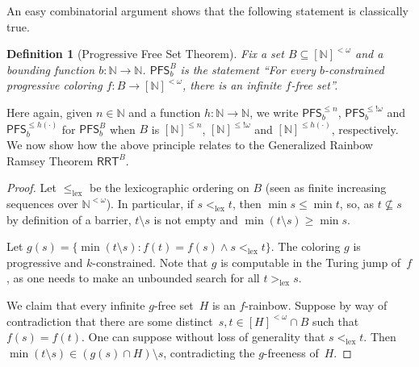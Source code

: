 \documentclass{article}
\newcommand{\RRT}[0]{\mathsf{RRT}}
\newcommand{\PFS}[0]{\mathsf{PFS}}
\newcommand{\NN}[0]{\mathbb{N}}
\newcommand{\lex}{\mathrm{lex}}
\def\qt#1{``#1''}%
\numberwithin{theorem}{section}
\newtheorem{proposition}[theorem]{Proposition}
\newtheorem{definition}[theorem]{Definition}
\begin{document}
An easy combinatorial argument shows that the following statement is classically true.


\begin{definition}[Progressive Free Set Theorem]
Fix a set $B \subseteq [\NN]^{<\omega}$ and a bounding function $b : \NN \to \NN$.
$\PFS^B_b$ is the statement \qt{For every $b$-constrained progressive coloring $f : B \to [\NN]^{<\omega}$, there is an infinite $f$-free set}.
\end{definition}

Here again, given $n \in \NN$ and a function $h : \NN \to \NN$, we write $\PFS^{\leq n}_b$, $\PFS^{\leq !\omega}_b$ and $\PFS^{\leq h(\cdot)}_b$ for $\PFS^B_b$ when $B$ is $[\NN]^{\leq n}$, $[\NN]^{\leq !\omega}$ and $[\NN]^{\leq h(\cdot)}$, respectively.
We now show how the above principle relates to the Generalized Rainbow Ramsey Theorem $\RRT^B$.

\begin{proof}
Let $\leq_{\lex}$ be the lexicographic ordering on $B$ (seen as finite increasing sequences over $\NN^{<\omega}$). %
In particular, if $s <_{\lex} t$, then $\min s \leq \min t$, so, as $t \not \subseteq s$ by definition of a barrier, $t \setminus s$ is not empty and $\min(t \setminus s) \geq \min s$.

Let $g(s) = \{\min(t \setminus s) : f(t) = f(s) \wedge s <_{\lex} t\}$. The coloring $g$ is progressive and $k$-constrained. Note that $g$ is computable in the Turing jump of~$f$, as one needs to make an unbounded search for all $t >_{\lex} s$.

We claim that every infinite $g$-free set~$H$ is an $f$-rainbow. Suppose by way of contradiction that there are some distinct~$s, t \in [H]^{<\omega} \cap B$ such that $f(s) = f(t)$. One can suppose without loss of generality that $s <_{\lex} t$. Then $\min(t \setminus s) \in (g(s) \cap H) \setminus s$, contradicting the $g$-freeness of~$H$.
\end{proof}
\end{document}
